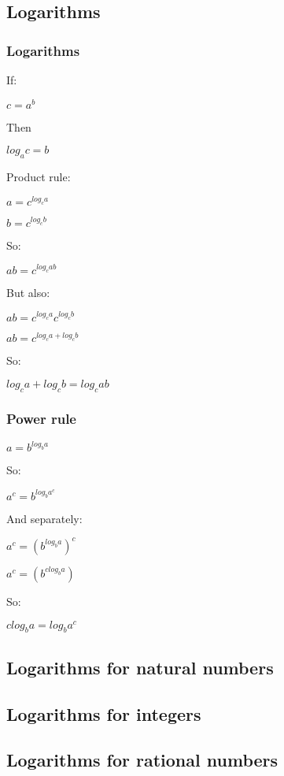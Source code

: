 \subsection{Logarithms}

\subsubsection{Logarithms}

If:

$c=a^b$

Then

$log_ac=b$

Product rule:

$a=c^{log_ca }$

$b=c^{log_cb }$

So:

$ab=c^{log_cab }$

But also:

$ab=c^{log_ca }c^{log_cb }$

$ab=c^{log_ca + log_cb }$

So:

$log_ca+log_cb=log_cab$

\subsubsection{Power rule}

$a=b^{log_ba}$

So:

$a^c=b^{log_ba^c}$

And separately:

$a^c=(b^{log_ba})^c$

$a^c=(b^{clog_ba})$

So:

$clog_ba=log_ba^c$

\subsection{Logarithms for natural numbers}

\subsection{Logarithms for integers}

\subsection{Logarithms for rational numbers}

